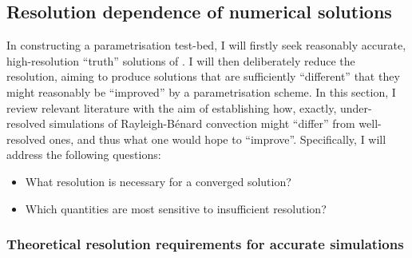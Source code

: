 \documentclass[titlepage]{article}
\numberwithin{equation}{section}
\newcommand{\rb}{Rayleigh-B\'{e}nard}
\begin{document}
\subsection{Resolution dependence of numerical solutions}
In constructing a parametrisation test-bed, I will firstly seek
reasonably accurate, high-resolution ``truth'' solutions of
. I will then deliberately reduce
the resolution, aiming to produce solutions that are sufficiently
``different'' that they might reasonably be ``improved'' by a parametrisation
scheme. In this section, I review relevant literature with the aim of
establishing how, exactly, under-resolved simulations of \rb{} convection
might ``differ'' from well-resolved ones, and thus what one would hope to
``improve''. Specifically, I will address the following questions:
\begin{itemize}
    \item What resolution is necessary for a converged solution?
    \item Which quantities are most sensitive to insufficient resolution?
\end{itemize}

\subsubsection{Theoretical resolution requirements for accurate simulations}%
\label{sec:res_requirements}
\end{document}
